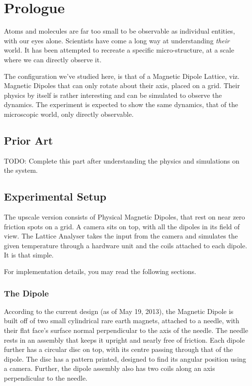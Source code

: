 \chapter{Prologue}
	Atoms and molecules are far too small to be observable as individual entities, with our eyes alone. Scientists have come a long way at understanding \emph{their} world. It has been attempted to recreate a specific micro-structure, at a scale where we can directly observe it.
	\par
	The configuration we've studied here, is that of a Magnetic Dipole Lattice, viz. Magnetic Dipoles that can only rotate about their axis, placed on a grid. Their physics by itself is rather interesting and can be simulated to observe the dynamics. The experiment is expected to show the same dynamics, that of the microscopic world, only directly observable.

\section{Prior Art}
	TODO: Complete this part after understanding the physics and simulations on the system.

\section{Experimental Setup}
	The upscale version consists of Physical Magnetic Dipoles, that rest on near zero friction spots on a grid. A camera sits on top, with all the dipoles in its field of view. The Lattice Analyser takes the input from the camera and simulates the given temperature through a hardware unit and the coils attached to each dipole. It is that simple.
	\par
	For implementation details, you may read the following sections.
	\subsection{The Dipole}
		According to the current design (as of May 19, 2013), the Magnetic Dipole is built off of two small cylindrical rare earth magnets, attached to a needle,  with their flat face's surface normal perpendicular to the axis of the needle. The needle rests in an assembly that keeps it upright and nearly free of friction. Each dipole further has a circular disc on top, with its centre passing through that of the dipole. The disc has a pattern printed, designed to find its angular position using a camera. Further, the dipole assembly also has two coils along an axis perpendicular to the needle.
